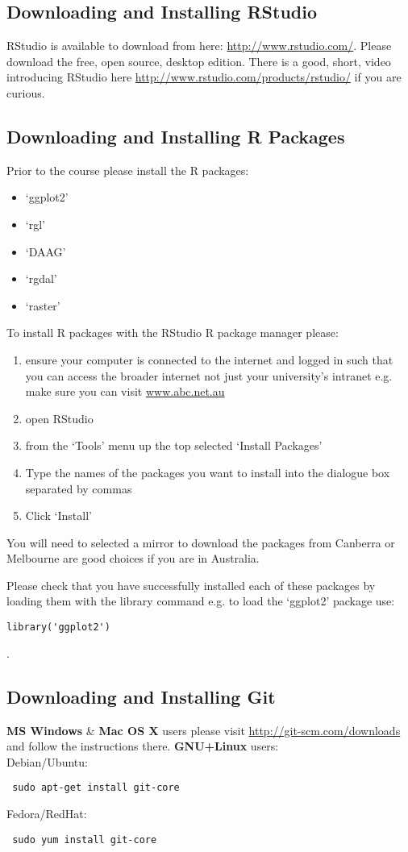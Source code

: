\documentclass{article}[12pt]
\begin{document}
\subsection*{Downloading and Installing RStudio}
RStudio is available to download from here: \url{http://www.rstudio.com/}.
Please download the free, open source, desktop edition.
There is a good, short, video introducing RStudio here \url{http://www.rstudio.com/products/rstudio/} if you are curious.

\subsection*{Downloading and Installing R Packages}
Prior to the course please install the R packages: \begin{itemize}
 \item `ggplot2'
 \item `rgl'
 \item `DAAG'
 \item `rgdal'
 \item `raster'
\end{itemize}

To install R packages with the RStudio R package manager please: \begin{enumerate}
\item ensure your computer is connected to the internet and logged in such that you can access the broader internet not just your university's intranet e.g. make sure you can visit \url{www.abc.net.au}
\item open RStudio
\item from the `Tools' menu up the top selected `Install Packages'
\item Type the names of the packages you want to install into the dialogue box separated by commas
\item Click `Install'
\end{enumerate}
You will need to selected a mirror to download the packages from Canberra or Melbourne are good choices if you are in Australia.

Please check that you have successfully installed each of these packages by loading them with the library command e.g. to load the `ggplot2' package use:
\begin{verbatim}
library('ggplot2')
\end{verbatim}.

\subsection*{Downloading and Installing Git}
\textbf{MS Windows} \& \textbf{Mac OS X} users please visit \url{http://git-scm.com/downloads} and follow the instructions there.\newline
\newline
\textbf{GNU+Linux} users:\\
Debian/Ubuntu: \begin{verbatim} sudo apt-get install git-core \end{verbatim} 
Fedora/RedHat: \begin{verbatim} sudo yum install git-core \end{verbatim}
\end{document}
